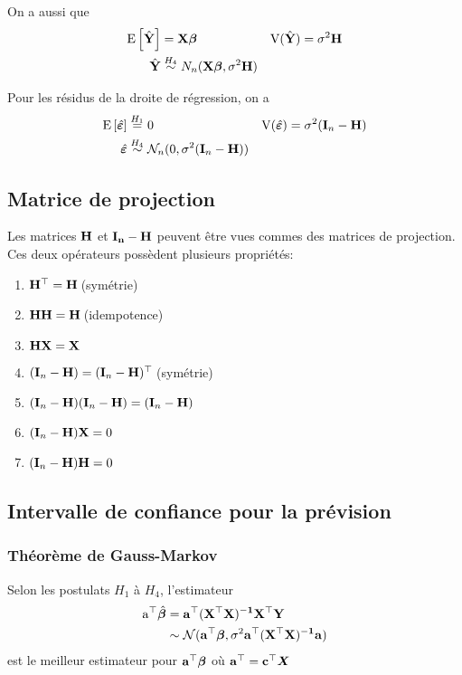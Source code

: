 \documentclass[10pt, french]{article}
\begin{document}
\begin{multicols*}{3}
On a aussi que
\begin{align*}
\mathrm{E} \left[ \hat{\mathbf{Y}} \right] &= \mathbf{X} \bm{\beta} & 
\text{V}(\hat{\mathbf{Y}}) &= \sigma^2 \mathbf{H} \\
\hat{\mathbf{Y}} &\overset{H_4}{\sim} N_n(\mathbf{X} \bm{\beta} , \sigma^2 \mathbf{H})\\
\end{align*}

Pour les résidus de la droite de régression, on a
\begin{align*}
\mathrm{E} \left[ \hat{\bm{\varepsilon}} \right] &\overset{H_1}{=} 0 & 
\text{V}(\hat{\bm{\varepsilon}}) &= \sigma^2(\mathbf{I}_{n} - \mathbf{H}) \\
\hat{\bm{\varepsilon}} &\overset{H_4}{\sim} \mathcal{N}_n(0, \sigma^2 (\mathbf{I}_{n} - \mathbf{H})) 
\end{align*}

\subsection*{Matrice de projection}
Les matrices $\mathbf{H}$ et $\mathbf{I_n - H}$ peuvent être vues commes des matrices de projection. Ces deux opérateurs possèdent plusieurs propriétés:
\begin{enumerate}
	\item $\mathbf{H}^\top = \mathbf{H}\:$(symétrie)
	\item $\mathbf{H}\mathbf{H} = \mathbf{H}\:$(idempotence)
	\item $\mathbf{HX} = \mathbf{X}$
	\item $(\mathbf{I}_n - \mathbf{H}) = (\mathbf{I}_n - \mathbf{H})^\top \:$(symétrie)
	\item $(\mathbf{I}_n - \mathbf{H})(\mathbf{I}_n - \mathbf{H}) = (\mathbf{I}_n - \mathbf{H})$
	\item $(\mathbf{I}_n - \mathbf{H})\mathbf{X} = 0 $
	\item $(\mathbf{I}_n - \mathbf{H})\mathbf{H} = 0 $
\end{enumerate}

\subsection*{Intervalle de confiance pour la prévision}
\subsubsection*{Théorème de Gauss-Markov}
Selon les postulats $H_1$ à $H_4$, l'estimateur
\begin{align*}
\mathrm{a^\top} \hat{\bm{\beta}} 
&= \mathbf{a^\top (X^\top X)^{-1} X^\top Y}\\
&\sim \mathcal{N}(\mathbf{a^\top} \bm{\beta}, \sigma^{2}\mathbf{a^\top(X^\top X)^{-1}a})
\end{align*}
est le meilleur estimateur pour $\mathbf{a^\top} \bm{\beta}$ où $\mathbf{a^\top} = \mathbf{c^\top} \bm{X} $ 


\end{multicols*}
\end{document}

